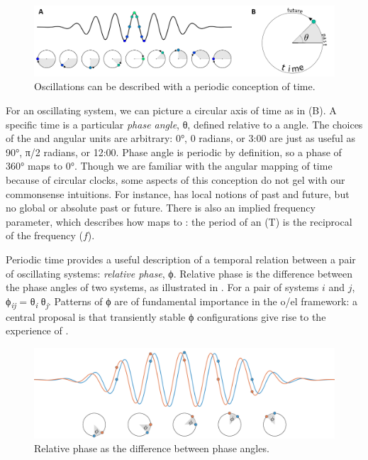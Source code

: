   
\begin{figure}
\includegraphics[width=\textwidth]{figures/Tilsen-img2.png}
\caption{Oscillations can be described with a periodic conception of time.}
\label{fig:1:2}
\end{figure}
 

  For an oscillating system, we can picture a circular axis of time as in {}(B). A specific time is a particular \textit{phase angle}, θ, defined relative to a  angle. The choices of the  and angular units are arbitrary: 0°, 0 radians, or 3:00 are just as useful as 90°, π/2 radians, or 12:00. Phase angle is periodic by definition, so a phase of 360° maps to 0°. Though we are familiar with the angular mapping of time because of circular clocks, some aspects of this conception do not gel with our commonsense intuitions. For instance,  has local notions of past and future, but no global or absolute past or future. There is also an implied frequency parameter, which describes how  maps to : the period of an  (T) is the reciprocal of the frequency ($f$).

  Periodic time provides a useful description of a temporal relation between a pair of oscillating systems: \textit{relative phase}, ϕ. Relative phase is the difference between the phase angles of two systems, as illustrated in {}. For a pair of systems $i$ and $j$, ϕ\textit{\textsubscript{ij}}\textsubscript{} = θ\textit{\textsubscript{i}} \textminus{} θ\textit{\textsubscript{j}}. Patterns of ϕ are of fundamental importance in the o/el framework: a central proposal is that transiently stable ϕ configurations give rise to the experience of .  

  
\begin{figure}
\includegraphics[width=\textwidth]{figures/Tilsen-img3.png}
\caption{Relative phase as the difference between phase angles.}
\label{fig:1:3}
\end{figure}
 


